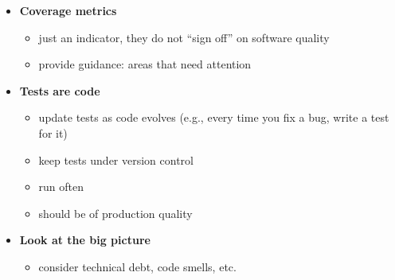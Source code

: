 \begin{keybox}
\begin{itemize}
  \item \textbf{Coverage metrics}
  \begin{itemize}
    \item just an indicator, they do not ``sign off'' on software quality
    \item provide guidance: areas that need attention
  \end{itemize}
  \item \textbf{Tests are code}
  \begin{itemize}
    \item update tests as code evolves (e.g., every time you fix a bug, write a test for it)
    \item keep tests under version control
    \item run often
    \item should be of production quality
  \end{itemize}
  \item \textbf{Look at the big picture}
  \begin{itemize}
    \item consider technical debt, code smells, etc.
  \end{itemize}
\end{itemize}
\end{keybox}

